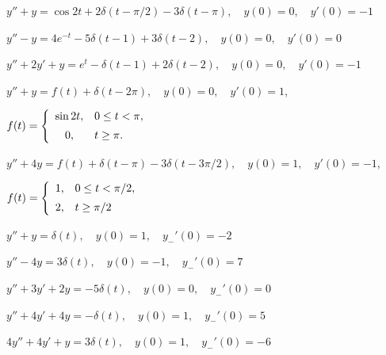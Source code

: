 \begin{exerciselist}
  \item\label{exer:8.7.16}
        $y''+y=\cos2t+2\delta(t-\pi/2)-3\delta(t-\pi),\quad y(0)=0,\quad y'(0)=-1$

  \item\label{exer:8.7.17} \CGex
        $y''-y=4e^{-t}-5\delta(t-1)+3\delta(t-2),\quad y(0)=0,\quad y'(0)=0$

  \item\label{exer:8.7.18} $y''+2y'+y=e^{t}-\delta(t-1)+2\delta(t-2),\quad y(0)=0,\quad y'(0)=-1$

  \item\label{exer:8.7.19} $y''+y=f(t)+\delta(t-2\pi),\quad y(0)=0,\quad y'(0)=1$, 

  $f(t)=\displaystyle{\left\{\begin{array}{cl}\sin2t,&0\le t<\pi,\\[5pt]0,&t\ge\pi.\end{array}\right.}$

  \item\label{exer:8.7.20}
        $y''+4y=f(t)+\delta(t-\pi)-3\delta(t-3\pi/2),\quad y(0)=1,\quad y'(0)=-1$, 

  $f(t)=\displaystyle{\left\{\begin{array}{cl}1,&0\le t<\pi/2,\\[5pt]2,&t\ge \pi/2\end{array}\right.}$

  \item\label{exer:8.7.21} $y''+y=\delta(t),\quad y(0)=1,\quad y_{-}'(0)=-2$

  \item\label{exer:8.7.22} $y''-4y=3\delta(t),\quad y(0)=-1,\quad y_{-}'(0)=7$

  \item\label{exer:8.7.23} $y''+3y'+2y=-5\delta(t),\quad y(0)=0,\quad y_{-}'(0)=0$

  \item\label{exer:8.7.24} $y''+4y'+4y=-\delta(t),\quad y(0)=1,\quad y_{-}'(0)=5$

  \item\label{exer:8.7.25} $4y''+4y'+y=3\delta(t),\quad y(0)=1,\quad y_{-}'(0)=-6$



\end{exerciselist}
